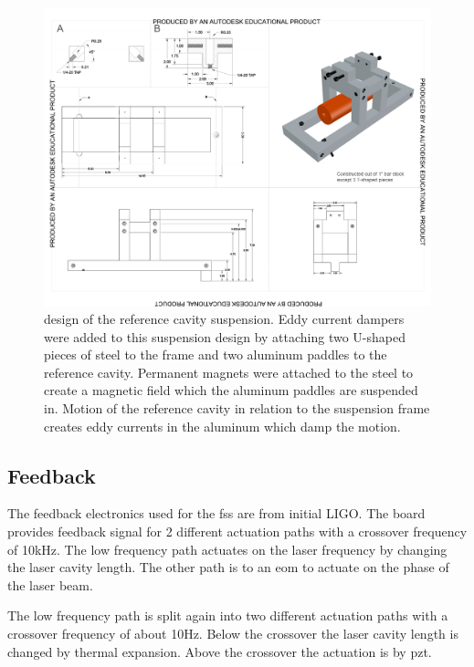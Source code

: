 \begin{figure}[htbp]
	\centering
		\includegraphics[width=15cm]{./figures/refcavsusdesign.pdf}
	\caption[Reference Cavity Suspension Design]{design of the reference cavity suspension.
        Eddy current dampers were added to this suspension design by attaching two U-shaped
        pieces of steel to the frame and two aluminum paddles to the reference cavity.
        Permanent magnets were attached to the steel to create a magnetic field which the
        aluminum paddles are suspended in.
        Motion of the reference cavity in relation to the suspension frame creates eddy
        currents in the aluminum which damp the motion.
        }
	\label{fig:refcav_sus}
\end{figure}


\subsection{Feedback}
The feedback electronics used for the \ac{fss} are from initial LIGO. The board
provides feedback signal for 2 different actuation paths with a crossover
frequency of 10kHz.
The low frequency path actuates on the laser frequency by changing the laser
cavity length.
The other path is to an \ac{eom} to actuate on the phase of the laser beam.

The low frequency path is split again into two different actuation
paths with a crossover frequency of about 10Hz.
Below the crossover the laser cavity length is changed by thermal expansion.
Above the crossover the actuation is by \ac{pzt}.


